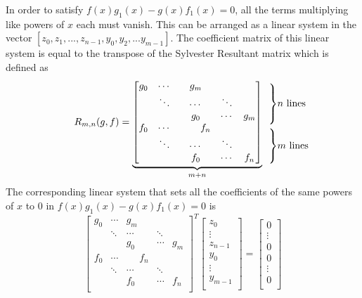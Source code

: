 In order to satisfy $f(x) g_1(x) - g(x) f_1(x) = 0$, all the terms multiplying like powers of $x$ each must vanish. This can be arranged as a linear system in the vector $[ z_0,z_1,..., z_{n-1},y_0,y_2,...y_{m-1}]$. The coefficient matrix of this linear system is equal to the transpose of the Sylvester Resultant matrix which is defined as
\begin{align*}
R_{m,n}(g,f)=
\underbrace{
\begin{bmatrix}
g_0 & \cdots & g_m & & \\
&\ddots & \cdots & \ddots & \\
& & g_0 & \cdots & g_m \\
f_0 & \cdots & ~~~~~~f_n & & \\
&\ddots & \cdots & \ddots & \\
& &f_0 & \cdots &f_n \\
\end{bmatrix}
}_{m+n}
\begin{array}{l}
  \\[-8mm] \rdelim\}{3.7}{6mm}[$n$ lines] \\ \\ \\[4mm]  \rdelim\}{3}{6mm}[$m$ lines] \\ \\
\end{array} \\[-1ex]
\end{align*}

The corresponding linear system that sets all the coefficients of the same powers of $x$ to $0$ in $f(x) g_1(x) - g(x) f_1(x) = 0$ is 
\[
\begin{bmatrix}
g_0 & \cdots & g_m & & \\
&\ddots & \cdots & \ddots & \\
& & g_0 & \cdots & g_m \\
f_0 & \cdots &~~~~~~f_n & & \\
&\ddots & \cdots & \ddots & \\
& &f_0 & \cdots &f_n \\
\end{bmatrix}^T 
\begin{bmatrix}
z_0\\
\vdots\\
z_{n-1}\\
y_0\\
\vdots \\
y_{m-1}\\
\end{bmatrix} = 
\begin{bmatrix}
0\\
\vdots\\
0\\
0\\
\vdots\\
0\\
\end{bmatrix}
\]

